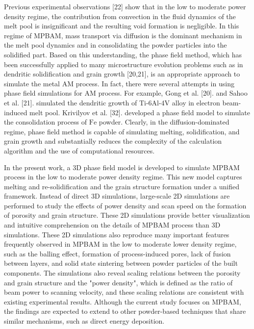 \documentclass[10pt]{article}
\begin{document}
Previous experimental observations [22] show that in the low to moderate power density regime, the contribution from convection in the fluid dynamics of the melt pool is insignificant and the resulting void formation is negligible. In this regime of MPBAM, mass transport via diffusion is the dominant mechanism in the melt pool dynamics and in consolidating the powder particles into the solidified part. Based on this understanding, the phase field method, which has been successfully applied to many microstructure evolution problems such as in dendritic solidification and grain growth [20,21], is an appropriate approach to simulate the metal AM process. In fact, there were several attempts in using phase field simulations for AM process. For example, Gong et al. [20]. and Sahoo et al. [21]. simulated the dendritic growth of Ti-6Al-4V alloy in electron beam-induced melt pool. Krivilyov et al. [32]. developed a phase field model to simulate the consolidation process of $\mathrm{Fe}$ powder. Clearly, in the diffusion-dominated regime, phase field method is capable of simulating melting, solidification, and grain growth and substantially reduces the complexity of the calculation algorithm and the use of computational resources.

In the present work, a 3D phase field model is developed to simulate MPBAM process in the low to moderate power density regime. This new model captures melting and re-solidification and the grain structure formation under a unified framework. Instead of direct 3D simulations, large-scale 2D simulations are performed to study the effects of power density and scan speed on the formation of porosity and grain structure. These 2D simulations provide better visualization and intuitive comprehension on the details of MPBAM process than 3D simulations. These 2D simulations also reproduce many important features frequently observed in MPBAM in the low to moderate lower density regime, such as the balling effect, formation of process-induced pores, lack of fusion between layers, and solid state sintering between powder particles of the built components. The simulations also reveal scaling relations between the porosity and grain structure and the "power density", which is defined as the ratio of beam power to scanning velocity, and these scaling relations are consistent with existing experimental results. Although the current study focuses on MPBAM, the findings are expected to extend to other powder-based techniques that share similar mechanisms, such as direct energy deposition.
\end{document}
